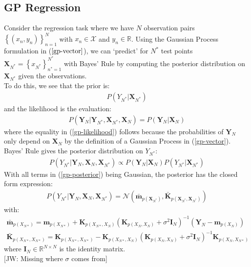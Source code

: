 \documentclass{article}
\newcommand{\jw}[1]{{\color{gray} [JW: #1]}}
\numberwithin{equation}{section}
\begin{document}
\subsection{GP Regression}
Consider the regression task where we have $N$ observation pairs $\left\{(x_n, y_n)\right\}_{n=1}^{N}$ with $x_n \in \mathcal{X}$ and $y_n \in \mathbb{R}$. Using the Gaussian Process formulation in ($\ref{gp-vector}$), we can `predict' for $N^*$ test points $\mathbf{X}_{N^*} = \left\{ x_{N^*}\right\}_{n^*=1}^{N^*}$ with Bayes' Rule by computing the posterior distribution on $\mathbf{X}_{N^*}$ given the observations.
\\To do this, we see that the prior is:
\begin{align}
    \label{gp-prior}
    P\left(Y_{N^*}\vert \mathbf{X}_{N^*}\right)
\end{align}
and the likelihood is the evaluation:
\begin{align}
     \label{gp-likelihood}
    P\left(\mathbf{Y}_{N} \vert \mathbf{Y}_{N^*}, \mathbf{X}_{N^*}, \mathbf{X}_{N} \right) = P\left(\mathbf{Y}_{N} \vert \mathbf{X}_{N} \right)
\end{align}
where the equality in (\ref{gp-likelihood}) follows because the probabilities of $\mathbf{Y}_N$ only depend on $\mathbf{X}_N$ by the definition of a Gaussian Process in (\ref{gp-vector}).
\\Bayes' Rule gives the posterior distribution on $Y_{N^*}$:
\begin{align}
     P\left(Y_{N^*} | \mathbf{Y}_{N},  \mathbf{X}_{N},  \mathbf{X}_{N^*}\right) \propto P\left(\mathbf{Y}_{N} \vert \mathbf{X}_{N} \right) P\left(Y_{N^*}\vert \mathbf{X}_{N^*}\right)
    \label{gp-posterior}
\end{align}
With all terms in (\ref{gp-posterior}) being Gaussian, the posterior has the closed form expression:
\begin{align}
    P\left(Y_{N^*} | \mathbf{Y}_{N},  \mathbf{X}_{N},  \mathbf{X}_{N^*}\right)  =  \mathcal{N}\left(\bar{\mathbf{m}}_{p(\mathbf{X}_{N^*})}, \bar{\mathbf{K}}_{p(\mathbf{X}_{N^*}, \mathbf{X}_{N^*})}\right)
\end{align}
with:
\begin{align}
    \label{gp-posterior-mean}
    \bar{\mathbf{m}}_{p(X_{N*})} = \mathbf{m}_{p(X_{N*})} + \mathbf{K}_{p(X_{N*}, X_N)} \left( \mathbf{K}_{p(X_N, X_N)} + \sigma^2 \mathbf{I}_N\right)^{-1} \left( \mathbf{Y}_N - \mathbf{m}_{p(X_N)}\right)\\
    \label{gp-posterior-covariance}
    \bar{\mathbf{K}}_{p(X_{N*}, X_{N*})} = \mathbf{K}_{p(X_{N*}, X_{N*})} - \mathbf{K}_{p(X_{N*}, X_N)}\left( \mathbf{K}_{p(X_N, X_N)} + \sigma^2 \mathbf{I}_N\right)^{-1}\mathbf{K}_{p(X_N, X_{N*})}
\end{align}
where $\mathbf{I}_N \in \mathbb{R}^{N \times N}$ is the identity matrix.
\\\jw{Missing where $\sigma$ comes from}
\end{document}
